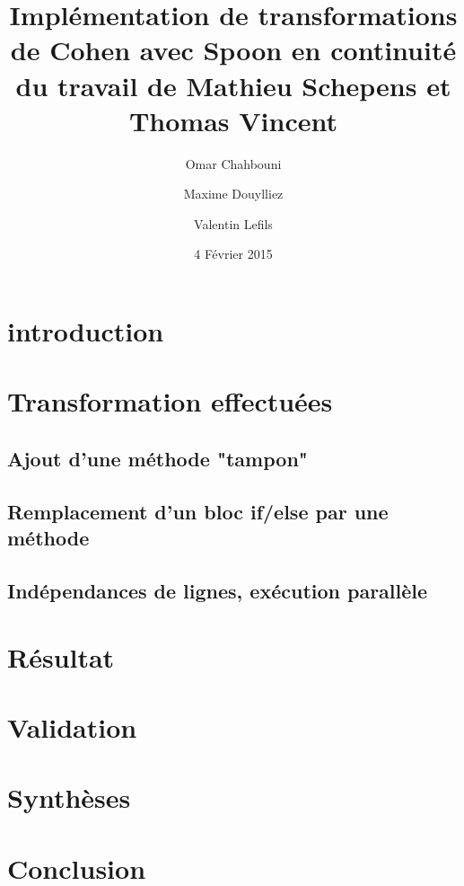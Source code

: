 \documentclass[11pt,a4paper]{article}
\author{Omar Chahbouni \and Maxime Douylliez\and Valentin Lefils}
\title{Implémentation de transformations de Cohen avec Spoon en continuité du travail de  Mathieu Schepens et Thomas Vincent}
\date{4 Février 2015}
\begin{document}
\maketitle
\tableofcontents
\section{introduction}
\section{Transformation effectuées}
\subsection{Ajout d'une méthode "tampon"}
\subsection{Remplacement d'un bloc if/else par une méthode}
\subsection{Indépendances de lignes, exécution parallèle}
\section{Résultat}
\section{Validation}
\section{Synthèses}
\section{Conclusion}




\end{document}
